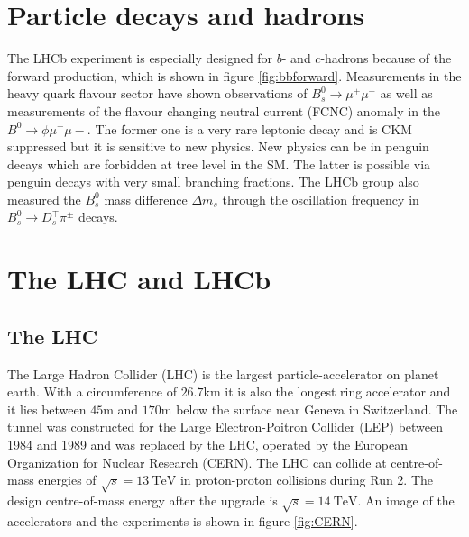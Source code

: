 \section{Particle decays and hadrons}
\label{sec:decays}

The LHCb experiment is especially designed for $\textit{b}$- and $\textit{c}$-hadrons because of the forward production, which is shown in figure \ref{fig:bbforward}.
Measurements in the heavy quark flavour sector have shown observations of $\textit{B}_s^0 \to \mu^{+} \mu^{-}$ \cite{Bmumu} as well as measurements of the flavour changing neutral current (FCNC) anomaly in the
$\textit{B}^0 \to \phi \mu^{+} \mu{-}$.
The former one is a very rare leptonic decay and is CKM suppressed but it is sensitive to new physics.
New physics can be in penguin decays which are forbidden at tree level in the SM.
The latter is possible via penguin decays with very small branching fractions\cite{bsll}. The LHCb group also measured the $\textit{B}_s^0$ mass difference\cite{massdiff} $\Delta m_s$ through the oscillation frequency in $\textit{B}_s^0 \to \textit{D}_s^{\mp} \pi^{\pm}$ decays.


\section{The LHC and LHCb}
\label{sec:lhcandB}

\subsection{The LHC}
The Large Hadron Collider (LHC)\cite{lhcInfo} is the largest particle-accelerator on planet earth. With a circumference of $26.7\si{\kilo\metre}$ it is also the longest ring accelerator and it lies between $45\si{\metre}$ and $170\si{\metre}$ below the surface near Geneva in Switzerland. The tunnel was constructed for the Large Electron-Poitron Collider (LEP) between 1984 and 1989 and was replaced by the LHC, operated by the European Organization for Nuclear Research (CERN). The LHC can collide at centre-of-mass energies of $\sqrt{s} = \SI{13}{\tera\electronvolt}$ in proton-proton collisions during Run 2. The design centre-of-mass energy after the upgrade is $\sqrt{s} = \SI{14}{\tera\electronvolt}$.\cite{LHCDR}
An image of the accelerators and the experiments is shown in figure \ref{fig:CERN}.

